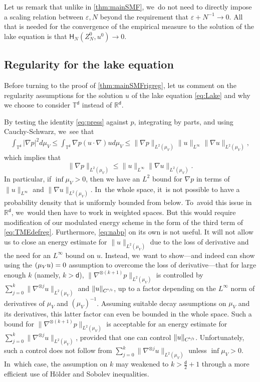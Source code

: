 \documentclass[10pt]{amsart}
\theoremstyle{plain}
\theoremstyle{definition}
\let\div\relax
\DeclareMathOperator{\div}{\mathrm{div}}
\newcommand{\R}{{\mathbb{R}}}
\newcommand{\T}{{\mathbb{T}}}
\let\vep\varepsilon
\let\nab\nabla
\let\uz Z
\newcommand{\Hr}{\mathsf{H}}
\renewcommand{\d}{\mathsf{d}}
\begin{document}
Let us remark that unlike in \cref{thm:mainSMF}, we~do not need to directly impose a scaling relation between $\vep, N$ beyond the requirement that $\vep + N^{-1}\to 0$. All that is needed for the convergence of the empirical measure to the solution of the lake equation is that $\Hr_{N}(\uz_N^0,u^0)\to 0$.

\subsection{Regularity for the lake equation}\label{ssec:appregLake}
Before turning to the proof of \cref{thm:mainSMFrigreg}, let us comment on the regularity assumptions for the solution $u$ of the lake equation \eqref{eq:Lake} and why we choose to consider $\T^\d$ instead of $\R^\d$.

By testing the identity \eqref{eq:press} against $p$, integrating by parts, and using Cauchy-Schwarz, we~see that
\begin{align*}
\int_{\T^\d}|\nab p|^2 d\mu_V \le \int_{\T^\d}\nab p (u\cdot\nab)u d\mu_V \le \|\nab p\|_{L^2(\mu_V)} \|u\|_{L^\infty} \|\nab u\|_{L^2(\mu_V)},
\end{align*}
which implies that
\begin{equation}\label{eq:nabp}
\|\nab p\|_{L^2(\mu_V)} \le \|u\|_{L^\infty}\|\nab u\|_{L^2(\mu_V)}.
\end{equation}
In particular, if $\inf\mu_V >0$, then we have an $L^2$ bound for $\nab p$ in terms of $\|u\|_{L^\infty}$ and $\|\nab u\|_{L^2(\mu_V)}$. In~the whole space, it~is not possible to have a probability density that is uniformly bounded from below. To~avoid this issue in $\R^\d$, we~would then have to work in weighted spaces. But this would require modification of our modulated energy scheme in the form of the third term of \eqref{eq:TMEdefreg}. Furthermore, \eqref{eq:nabp} on its own is not useful. It will not allow us to close an energy estimate for $\|u\|_{L^2(\mu_V)}$ due to the loss of derivative and the need for an $L^\infty$ bound on $u$. Instead, we~want to show---and indeed can show using the $\div(\mu_Vu)=0$ assumption to overcome the loss of derivative---that for large enough $k$ (namely, $k>\d$), $\|\nab^{\otimes(k+1)}p\|_{L^2(\mu_V)}$ is controlled by $\sum_{j=0}^k\|\nab^{\otimes j} u\|_{L^2(\mu_V)}$ and $\|u\|_{C^{\sfrac{k}{2}}}$, up to a factor depending on the $L^\infty$ norm of derivatives of $\mu_V$ and $(\mu_V)^{-1}$. Assuming suitable decay assumptions on $\mu_V$ and its derivatives, this latter factor can even be bounded in the whole space. Such a bound for $\|\nab^{\otimes(k+1)}p\|_{L^2(\mu_V)}$ is acceptable for an energy estimate for $\sum_{j=0}^k\|\nab^{\otimes j}u\|_{L^2(\mu_V)}$, provided that one can control $\|u\|_{C^{\sfrac{k}{2}}}$. Unfortunately, such a control does not follow from $\sum_{j=0}^k\|\nab^{\otimes j}u\|_{L^2(\mu_V)}$ unless $\inf\mu_V>0$. In~which case, the assumption on $k$ may weakened to $k>\frac{\d}{2}+1$ through a more efficient use of Hölder and Sobolev inequalities.
\end{document}
